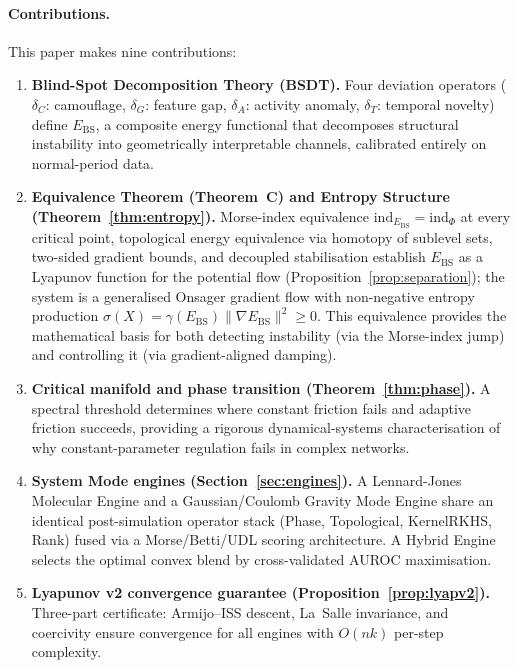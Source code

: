 \documentclass[final]{siamltex}
\newcommand{\norm}[1]{\lVert #1 \rVert}
\providecommand{\grad}{\nabla}
\newcommand{\Ebs}{E_{\mathrm{BS}}}
\begin{document}
\paragraph{Contributions.}
This paper makes nine contributions:
\begin{enumerate}
\item \textbf{Blind-Spot Decomposition Theory (BSDT).} Four
  deviation operators ($\delta_C$: camouflage, $\delta_G$: feature
  gap, $\delta_A$: activity anomaly, $\delta_T$: temporal novelty)
  define $\Ebs$, a composite energy functional that decomposes
  structural instability into geometrically interpretable channels,
  calibrated entirely on normal-period data.

\item \textbf{Equivalence Theorem (Theorem~C) and Entropy Structure
  (Theorem~\ref{thm:entropy}).} Morse-index equivalence
  $\mathrm{ind}_{\Ebs}=\mathrm{ind}_\Phi$ at every critical point,
  topological energy equivalence via homotopy of sublevel sets,
  two-sided gradient bounds, and decoupled stabilisation establish
  $\Ebs$ as a Lyapunov function for the potential flow
  (Proposition~\ref{prop:separation}); the system is a generalised
  Onsager gradient flow with non-negative entropy production
  $\sigma(X) = \gamma(\Ebs)\norm{\grad\Ebs}^2 \ge 0$.
  This equivalence provides the mathematical basis for both
  detecting instability (via the Morse-index jump) and controlling
  it (via gradient-aligned damping).

\item \textbf{Critical manifold and phase transition
  (Theorem~\ref{thm:phase}).} A spectral threshold determines
  where constant friction fails and adaptive friction succeeds,
  providing a rigorous dynamical-systems characterisation of why
  constant-parameter regulation fails in complex networks.

\item \textbf{System Mode engines
  (Section~\ref{sec:engines}).}  A Lennard-Jones Molecular Engine
  and a Gaussian/Coulomb Gravity Mode Engine share an identical
  post-simulation operator stack (Phase, Topological, KernelRKHS,
  Rank) fused via a Morse/Betti/UDL scoring architecture.
  A Hybrid Engine selects the optimal convex blend by
  cross-validated AUROC maximisation.

\item \textbf{Lyapunov v2 convergence guarantee
  (Proposition~\ref{prop:lyapv2}).}  Three-part certificate:
  Armijo--ISS descent, La~Salle invariance, and coercivity ensure
  convergence for all engines with $O(nk)$ per-step complexity.


\end{enumerate}
\end{document}
